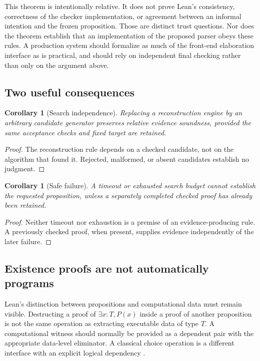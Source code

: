 \documentclass[11pt,a4paper]{article}
\newtheorem{corollary}[theorem]{Corollary}
\theoremstyle{remark}
\begin{document}
This theorem is intentionally relative. It does not prove Lean's consistency, correctness of the checker implementation, or agreement between an informal intention and the frozen proposition. Those are distinct trust questions. Nor does the theorem establish that an implementation of the proposed parser obeys these rules. A production system should formalize as much of the front-end elaboration interface as is practical, and should rely on independent final checking rather than only on the argument above.

\subsection{Two useful consequences}

\begin{corollary}[Search independence]
Replacing a reconstruction engine by an arbitrary candidate generator preserves relative evidence soundness, provided the same acceptance checks and fixed target are retained.
\end{corollary}
\begin{proof}
The reconstruction rule depends on a checked candidate, not on the algorithm that found it. Rejected, malformed, or absent candidates establish no judgment.
\end{proof}

\begin{corollary}[Safe failure]
A timeout or exhausted search budget cannot establish the requested proposition, unless a separately completed checked proof has already been retained.
\end{corollary}
\begin{proof}
Neither timeout nor exhaustion is a premise of an evidence-producing rule. A previously checked proof, when present, supplies evidence independently of the later failure.
\end{proof}

\subsection{Existence proofs are not automatically programs}

Lean's distinction between propositions and computational data must remain visible. Destructing a proof of \(\exists x:T,P(x)\) inside a proof of another proposition is not the same operation as extracting executable data of type \(T\). A computational witness should normally be provided as a dependent pair with the appropriate data-level eliminator. A classical choice operation is a different interface with an explicit logical dependency \cite{lean-validation}.
\end{document}
